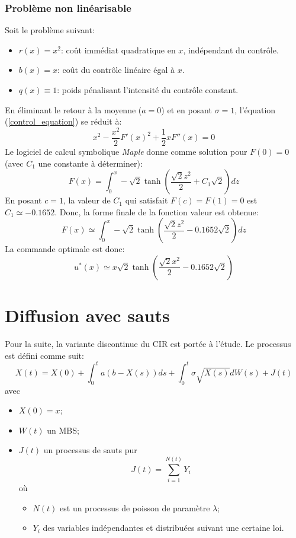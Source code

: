 \subsubsection{Problème non linéarisable}\label{p3}
Soit le problème suivant:
\begin{itemize}
    \item $r(x) = x^2$: coût immédiat quadratique en $x$, indépendant du contrôle.
    \item $b(x) = x$: coût du contrôle linéaire égal à $x$.
    \item $q(x) \equiv 1$: poids pénalisant l'intensité du contrôle constant.
\end{itemize}
En éliminant le retour à la moyenne ($a=0$) et en posant $\sigma=1$, l'équation (\ref{control_equation}) se réduit à:
\begin{equation}\label{reduced_control_equation}
    x^2-\frac{x^2}{2}{F'(x)}^2+\frac{1}{2}xF''(x)=0
\end{equation}
Le logiciel de calcul symbolique \textit{Maple} donne comme solution pour $F(0)=0$ (avec $C_1$ une constante à déterminer):
\[
    F(x)=\int_0^x-\sqrt{2}\tanh\left(\frac{\sqrt{2}z^2}{2}+C_1\sqrt{2}\right)dz
\]
En posant $c=1$, la valeur de $C_1$ qui satisfait $F(c)=F(1)=0$ est $C_1\simeq -0.1652$. Donc, la forme finale de la fonction valeur est obtenue:
\begin{equation}\label{sol_control_3}
    F(x)\simeq \int_0^x-\sqrt{2}\tanh\left(\frac{\sqrt{2}z^2}{2}-0.1652\sqrt{2}\right)dz
\end{equation}
La commande optimale est donc:
\begin{equation}\label{optimal_control_3}
    u^*(x)\simeq x\sqrt{2}\tanh\left(\frac{\sqrt{2}x^2}{2}-0.1652\sqrt{2}\right)
\end{equation}

\section{Diffusion avec sauts}
Pour la suite, la variante discontinue du \acs{CIR} est portée à l'étude. Le processus est défini comme suit:
\begin{equation}\label{jump_cir_sde}
    X(t)=X(0)+\int_0^t a(b-X(s))ds+\int_0^t\sigma\sqrt{X(s)}dW(s)+J(t)
\end{equation}
avec
\begin{itemize}
    \item $X(0)=x$;
    \item $W(t)$ un \acs{MBS};
    \item $J(t)$ un processus de sauts pur 
    \[
    J(t)=\sum_{i=1}^{N(t)}Y_i
    \]
    où
    \begin{itemize}
        \item $N(t)$ est un processus de poisson de paramètre $\lambda$;
        \item $Y_i$ des variables indépendantes et distribuées suivant une certaine loi.
    \end{itemize}
\end{itemize}

